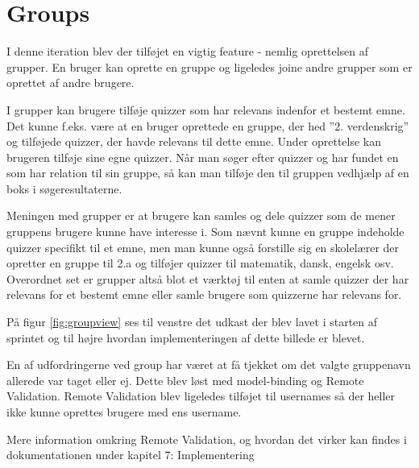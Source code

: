 \section{Groups}

I denne iteration blev der tilføjet en vigtig feature - nemlig oprettelsen af grupper.
En bruger kan oprette en gruppe og ligeledes joine andre grupper som er oprettet af andre brugere.

I grupper kan brugere tilføje quizzer som har relevans indenfor et bestemt emne. Det kunne f.eks. være at en bruger oprettede en gruppe, der hed ''2. verdenskrig'' og tilføjede quizzer, der havde relevans til dette emne. Under oprettelse kan brugeren tilføje sine egne quizzer. Når man søger efter quizzer og har fundet en som har relation til sin gruppe, så kan man tilføje den til gruppen vedhjælp af en boks i søgeresultaterne.

Meningen med grupper er at brugere kan samles og dele quizzer som de mener gruppens brugere kunne have interesse i.  Som nævnt kunne en gruppe indeholde quizzer specifikt til et emne, men man kunne også forstille sig en skolelærer der opretter en gruppe til 2.a og tilføjer quizzer til matematik, dansk, engelsk osv. Overordnet set er grupper altså blot et værktøj til enten at samle quizzer der har relevans for et bestemt emne eller samle brugere som quizzerne har relevans for.


På figur \ref{fig:groupview} ses til venstre det udkast der blev lavet i starten af sprintet og til højre hvordan implementeringen af dette billede er blevet.

En af udfordringerne ved group har været at få tjekket om det valgte gruppenavn allerede var taget eller ej. Dette blev løst med model-binding og Remote Validation. Remote Validation blev ligeledes tilføjet til  usernames så der heller ikke kunne oprettes brugere med ens username.

Mere information omkring Remote Validation, og hvordan det virker kan findes i dokumentationen under kapitel 7: Implementering
